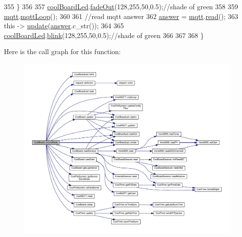 \begin{DoxyCode}
355     \}
356 
357     \hyperlink{classCoolBoard_a1b1d3c684a5baa56b08486e192fd8e97}{coolBoardLed}.\hyperlink{classCoolBoardLed_a93d545679237e8cc858324367149775c}{fadeOut}(128,255,50,0.5);\textcolor{comment}{//shade of green        }
358 
359     \hyperlink{classCoolBoard_a2399f44d7c23c1149a335cb3b46d90f1}{mqtt}.\hyperlink{classCoolMQTT_aa5eaae967b562b62cbcf2b8d81f6e5d5}{mqttLoop}();
360 
361     \textcolor{comment}{//read mqtt answer}
362     \hyperlink{classCoolBoard_a7b835fafd449e5282f7f91d787a2dc15}{answer} = \hyperlink{classCoolBoard_a2399f44d7c23c1149a335cb3b46d90f1}{mqtt}.\hyperlink{classCoolMQTT_ae3c18f6ae9723746d32765f1c8f176ca}{read}();
363     \textcolor{keyword}{this} -> \hyperlink{classCoolBoard_a8612756d3f73198cdde857a66f0fe690}{update}(\hyperlink{classCoolBoard_a7b835fafd449e5282f7f91d787a2dc15}{answer}.c\_str()); 
364 
365     \hyperlink{classCoolBoard_a1b1d3c684a5baa56b08486e192fd8e97}{coolBoardLed}.\hyperlink{classCoolBoardLed_a96e1ea13003eee34c9dbcef340404426}{blink}(128,255,50,0.5);\textcolor{comment}{//shade of green    }
366 
367 
368 \}
\end{DoxyCode}
Here is the call graph for this function\+:\nopagebreak
\begin{figure}[H]
\begin{center}
\leavevmode
\includegraphics[width=350pt]{classCoolBoard_aa0bbc4bc605e35618d18e68795c61363_cgraph}
\end{center}
\end{figure}
\mbox{\label{classCoolBoard_a486507b8f0981d3cc671ed31c2145755}} 

